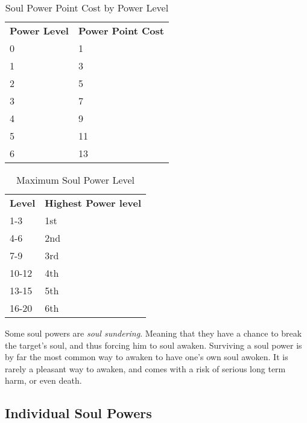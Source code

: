 \begin{table}[!htb]
  \caption{Soul Power Point Cost by Power Level}
  \begin{tabular}{p{2cm} p{3cm}}
    \textbf{Power Level} & \textbf{Power Point Cost} \\
    0 &  1 \\
    1 &  3 \\
    2 &  5 \\
    3 &  7 \\
    4 &  9 \\
    5 & 11 \\
    6 & 13 \\
  \end{tabular}
\end{table}

\begin{table}[!htb]
  \caption{Maximum Soul Power Level}
  \begin{tabular}{p{2cm} p{3cm}}
    \textbf{Level} & \textbf{Highest Power level} \\
    1-3   & 1st \\
    4-6   & 2nd \\
    7-9   & 3rd \\
    10-12 & 4th \\
    13-15 & 5th \\
    16-20 & 6th
  \end{tabular}
\end{table}

Some soul powers are \emph{soul sundering}. Meaning that they have a chance
to break the target's soul, and thus forcing him to soul awaken. Surviving a
soul power is by far the most common way to awaken to have one's own soul
awoken. It is rarely a pleasant way to awaken, and comes with a risk of
serious long term harm, or even death.

\subsection{Individual Soul Powers}

